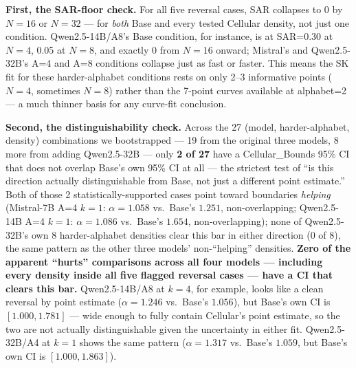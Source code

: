 \documentclass[11pt]{article}
\begin{document}
\textbf{First, the SAR-floor check.} For all five reversal cases, SAR collapses to 0 by $N=16$ or $N=32$ --- for \emph{both} Base and every tested Cellular density, not just one condition. Qwen2.5-14B/A8's Base condition, for instance, is at SAR=0.30 at $N=4$, 0.05 at $N=8$, and exactly 0 from $N=16$ onward; Mistral's and Qwen2.5-32B's A=4 and A=8 conditions collapse just as fast or faster. This means the SK fit for these harder-alphabet conditions rests on only 2--3 informative points ($N=4$, sometimes $N=8$) rather than the 7-point curves available at alphabet=2 --- a much thinner basis for any curve-fit conclusion.

\textbf{Second, the distinguishability check.} Across the 27 (model, harder-alphabet, density) combinations we bootstrapped --- 19 from the original three models, 8 more from adding Qwen2.5-32B --- only \textbf{2 of 27} have a Cellular\_Bounds 95\% CI that does not overlap Base's own 95\% CI at all --- the strictest test of ``is this direction actually distinguishable from Base, not just a different point estimate.'' Both of those 2 statistically-supported cases point toward boundaries \emph{helping} (Mistral-7B A=4 $k=1$: $\alpha=1.058$ vs.\ Base's $1.251$, non-overlapping; Qwen2.5-14B A=4 $k=1$: $\alpha=1.086$ vs.\ Base's $1.654$, non-overlapping); none of Qwen2.5-32B's own 8 harder-alphabet densities clear this bar in either direction (0 of 8), the same pattern as the other three models' non-``helping'' densities. \textbf{Zero of the apparent ``hurts'' comparisons across all four models --- including every density inside all five flagged reversal cases --- have a CI that clears this bar.} Qwen2.5-14B/A8 at $k=4$, for example, looks like a clean reversal by point estimate ($\alpha=1.246$ vs.\ Base's $1.056$), but Base's own CI is $[1.000, 1.781]$ --- wide enough to fully contain Cellular's point estimate, so the two are not actually distinguishable given the uncertainty in either fit. Qwen2.5-32B/A4 at $k=1$ shows the same pattern ($\alpha=1.317$ vs.\ Base's $1.059$, but Base's own CI is $[1.000, 1.863]$).
\end{document}
